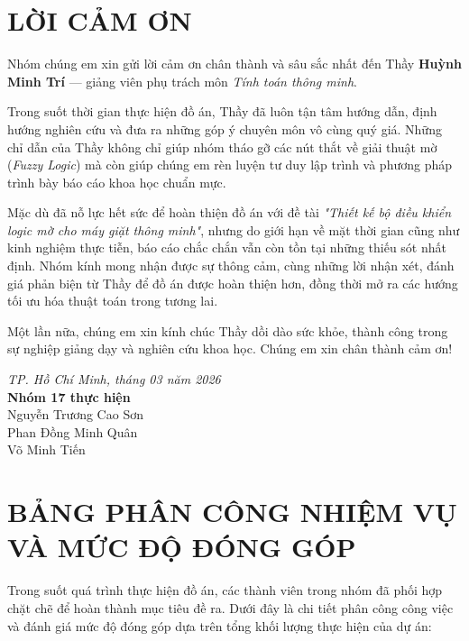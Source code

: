 \documentclass[12pt, a4paper]{article}
\begin{document}
\newpage
{}
\section*{LỜI CẢM ƠN}
Nhóm chúng em xin gửi lời cảm ơn chân thành và sâu sắc nhất đến Thầy \textbf{Huỳnh Minh Trí} — giảng viên phụ trách môn \textit{Tính toán thông minh}. 

Trong suốt thời gian thực hiện đồ án, Thầy đã luôn tận tâm hướng dẫn, định hướng nghiên cứu và đưa ra những góp ý chuyên môn vô cùng quý giá. Những chỉ dẫn của Thầy không chỉ giúp nhóm tháo gỡ các nút thắt về giải thuật mờ (\textit{Fuzzy Logic}) mà còn giúp chúng em rèn luyện tư duy lập trình và phương pháp trình bày báo cáo khoa học chuẩn mực.

Mặc dù đã nỗ lực hết sức để hoàn thiện đồ án với đề tài \textit{"Thiết kế bộ điều khiển logic mờ cho máy giặt thông minh"}, nhưng do giới hạn về mặt thời gian cũng như kinh nghiệm thực tiễn, báo cáo chắc chắn vẫn còn tồn tại những thiếu sót nhất định. Nhóm kính mong nhận được sự thông cảm, cùng những lời nhận xét, đánh giá phản biện từ Thầy để đồ án được hoàn thiện hơn, đồng thời mở ra các hướng tối ưu hóa thuật toán trong tương lai.

Một lần nữa, chúng em xin kính chúc Thầy dồi dào sức khỏe, thành công trong sự nghiệp giảng dạy và nghiên cứu khoa học. Chúng em xin chân thành cảm ơn!

\vspace{1cm}
\begin{flushright}
\textit{TP. Hồ Chí Minh, tháng 03 năm 2026} \\
\textbf{Nhóm 17 thực hiện} \\
\vspace{0.2cm}
Nguyễn Trương Cao Sơn \\
Phan Đồng Minh Quân \\
Võ Minh Tiến
\end{flushright}
\newpage

\newpage
{}
\section*{BẢNG PHÂN CÔNG NHIỆM VỤ VÀ MỨC ĐỘ ĐÓNG GÓP}

Trong suốt quá trình thực hiện đồ án, các thành viên trong nhóm đã phối hợp chặt chẽ để hoàn thành mục tiêu đề ra. Dưới đây là chi tiết phân công công việc và đánh giá mức độ đóng góp dựa trên tổng khối lượng thực hiện của dự án:
\end{document}
